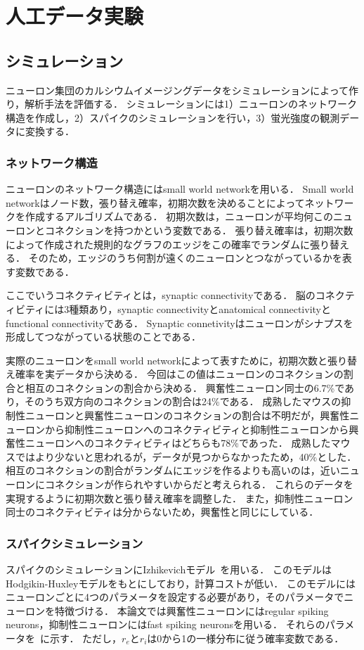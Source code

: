 \chapter{人工データ実験}
\section{シミュレーション}
ニューロン集団のカルシウムイメージングデータをシミュレーションによって作り，解析手法を評価する．
シミュレーションには1）ニューロンのネットワーク構造を作成し，2）スパイクのシミュレーションを行い，3）蛍光強度の観測データに変換する．
\subsection{ネットワーク構造}
ニューロンのネットワーク構造にはsmall world network\cite{}を用いる．
Small world networkはノード数，張り替え確率，初期次数を決めることによってネットワークを作成するアルゴリズムである．
初期次数は，ニューロンが平均何このニューロンとコネクションを持つかという変数である．
張り替え確率は，初期次数によって作成された規則的なグラフのエッジをこの確率でランダムに張り替える．
そのため，エッジのうち何割が遠くのニューロンとつながっているかを表す変数である．

ここでいうコネクティビティとは，synaptic connectivityである．
脳のコネクティビティには3種類あり，synaptic connectivityとanatomical connectivityとfunctional connectivityである．
Synaptic connetivityはニューロンがシナプスを形成してつながっている状態のことである．

実際のニューロンをsmall world networkによって表すために，初期次数と張り替え確率を実データから決める．
今回はこの値はニューロンのコネクションの割合と相互のコネクションの割合から決める．
興奮性ニューロン同士の6.7\%であり，そのうち双方向のコネクションの割合は24\%である\cite{}．
成熟したマウスの抑制性ニューロンと興奮性ニューロンのコネクションの割合は不明だが，興奮性ニューロンから抑制性ニューロンへのコネクティビティと抑制性ニューロンから興奮性ニューロンへのコネクティビティはどちらも78\%であった\cite{Holmgren2003}．
成熟したマウスではより少ないと思われるが，データが見つからなかったため，40\%とした．
相互のコネクションの割合がランダムにエッジを作るよりも高いのは，近いニューロンにコネクションが作られやすいからだと考えられる．
これらのデータを実現するように初期次数と張り替え確率を調整した．
また，抑制性ニューロン同士のコネクティビティは分からないため，興奮性と同じにしている．
\subsection{スパイクシミュレーション}
スパイクのシミュレーションにIzhikevichモデル~\cite{Izhikevich2003}を用いる．
このモデルはHodgikin-Huxleyモデルをもとにしており，計算コストが低い．
このモデルにはニューロンごとに4つのパラメータを設定する必要があり，そのパラメータでニューロンを特徴づける．
本論文では興奮性ニューロンにはregular spiking neurons，抑制性ニューロンにはfast spiking neuronsを用いる．
それらのパラメータを~に示す．
ただし，$r_e$と$r_i$は0から1の一様分布に従う確率変数である．

